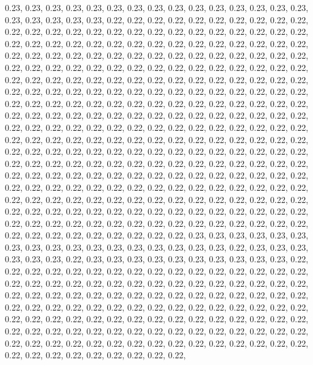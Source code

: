 \documentclass[11pt,]{article}
\begin{document}
0.23, 0.23, 0.23, 0.23, 0.23, 0.23, 0.23, 0.23, 0.23, 0.23, 0.23, 0.23,
0.23, 0.23, 0.23, 0.23, 0.23, 0.23, 0.23, 0.23, 0.22, 0.22, 0.22, 0.22,
0.22, 0.22, 0.22, 0.22, 0.22, 0.22, 0.22, 0.22, 0.22, 0.22, 0.22, 0.22,
0.22, 0.22, 0.22, 0.22, 0.22, 0.22, 0.22, 0.22, 0.22, 0.22, 0.22, 0.22,
0.22, 0.22, 0.22, 0.22, 0.22, 0.22, 0.22, 0.22, 0.22, 0.22, 0.22, 0.22,
0.22, 0.22, 0.22, 0.22, 0.22, 0.22, 0.22, 0.22, 0.22, 0.22, 0.22, 0.22,
0.22, 0.22, 0.22, 0.22, 0.22, 0.22, 0.22, 0.22, 0.22, 0.22, 0.22, 0.22,
0.22, 0.22, 0.22, 0.22, 0.22, 0.22, 0.22, 0.22, 0.22, 0.22, 0.22, 0.22,
0.22, 0.22, 0.22, 0.22, 0.22, 0.22, 0.22, 0.22, 0.22, 0.22, 0.22, 0.22,
0.22, 0.22, 0.22, 0.22, 0.22, 0.22, 0.22, 0.22, 0.22, 0.22, 0.22, 0.22,
0.22, 0.22, 0.22, 0.22, 0.22, 0.22, 0.22, 0.22, 0.22, 0.22, 0.22, 0.22,
0.22, 0.22, 0.22, 0.22, 0.22, 0.22, 0.22, 0.22, 0.22, 0.22, 0.22, 0.22,
0.22, 0.22, 0.22, 0.22, 0.22, 0.22, 0.22, 0.22, 0.22, 0.22, 0.22, 0.22,
0.22, 0.22, 0.22, 0.22, 0.22, 0.22, 0.22, 0.22, 0.22, 0.22, 0.22, 0.22,
0.22, 0.22, 0.22, 0.22, 0.22, 0.22, 0.22, 0.22, 0.22, 0.22, 0.22, 0.22,
0.22, 0.22, 0.22, 0.22, 0.22, 0.22, 0.22, 0.22, 0.22, 0.22, 0.22, 0.22,
0.22, 0.22, 0.22, 0.22, 0.22, 0.22, 0.22, 0.22, 0.22, 0.22, 0.22, 0.22,
0.22, 0.22, 0.22, 0.22, 0.22, 0.22, 0.22, 0.22, 0.22, 0.22, 0.22, 0.22,
0.22, 0.22, 0.22, 0.22, 0.22, 0.22, 0.22, 0.22, 0.22, 0.22, 0.22, 0.22,
0.22, 0.22, 0.22, 0.22, 0.22, 0.22, 0.22, 0.22, 0.22, 0.22, 0.22, 0.22,
0.22, 0.22, 0.22, 0.22, 0.22, 0.22, 0.22, 0.22, 0.22, 0.22, 0.22, 0.22,
0.22, 0.22, 0.22, 0.22, 0.22, 0.22, 0.22, 0.22, 0.22, 0.22, 0.22, 0.22,
0.22, 0.22, 0.22, 0.22, 0.22, 0.22, 0.22, 0.22, 0.22, 0.22, 0.22, 0.22,
0.22, 0.22, 0.22, 0.22, 0.22, 0.22, 0.22, 0.22, 0.22, 0.22, 0.22, 0.22,
0.22, 0.22, 0.22, 0.22, 0.22, 0.22, 0.23, 0.23, 0.23, 0.23, 0.23, 0.23,
0.23, 0.23, 0.23, 0.23, 0.23, 0.23, 0.23, 0.23, 0.23, 0.23, 0.23, 0.22,
0.23, 0.23, 0.23, 0.23, 0.23, 0.23, 0.22, 0.23, 0.23, 0.23, 0.23, 0.23,
0.23, 0.23, 0.23, 0.23, 0.23, 0.22, 0.22, 0.22, 0.22, 0.22, 0.22, 0.22,
0.22, 0.22, 0.22, 0.22, 0.22, 0.22, 0.22, 0.22, 0.22, 0.22, 0.22, 0.22,
0.22, 0.22, 0.22, 0.22, 0.22, 0.22, 0.22, 0.22, 0.22, 0.22, 0.22, 0.22,
0.22, 0.22, 0.22, 0.22, 0.22, 0.22, 0.22, 0.22, 0.22, 0.22, 0.22, 0.22,
0.22, 0.22, 0.22, 0.22, 0.22, 0.22, 0.22, 0.22, 0.22, 0.22, 0.22, 0.22,
0.22, 0.22, 0.22, 0.22, 0.22, 0.22, 0.22, 0.22, 0.22, 0.22, 0.22, 0.22,
0.22, 0.22, 0.22, 0.22, 0.22, 0.22, 0.22, 0.22, 0.22, 0.22, 0.22, 0.22,
0.22, 0.22, 0.22, 0.22, 0.22, 0.22, 0.22, 0.22, 0.22, 0.22, 0.22, 0.22,
0.22, 0.22, 0.22, 0.22, 0.22, 0.22, 0.22, 0.22, 0.22, 0.22, 0.22, 0.22,
0.22, 0.22, 0.22, 0.22, 0.22, 0.22, 0.22, 0.22, 0.22, 0.22, 0.22, 0.22,
\end{document}

